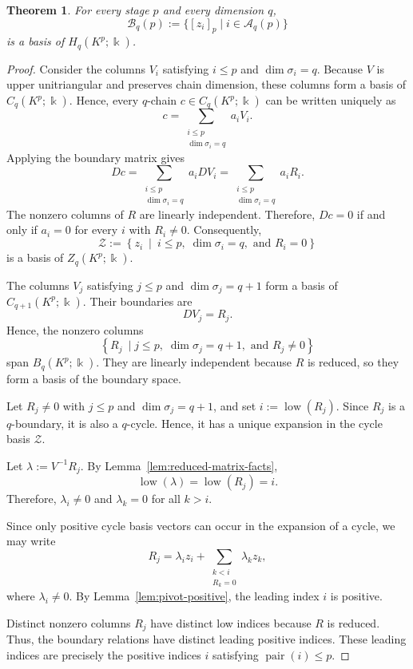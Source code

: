 \documentclass[11pt]{article}
\theoremstyle{paperdefinition}
\theoremstyle{paperplain}
\newtheorem{theorem}[definition]{Theorem}
\theoremstyle{paperremark}
\begin{document}
\begin{theorem}
\label{thm:active-basis}
For every stage $p$ and every dimension $q$,
\[
\mathcal B_q(p) := \{[z_i]_p\mid i\in\mathcal A_q(p)\}
\]
is a basis of $H_q(K^p;\Bbbk)$.
\end{theorem}

\begin{proof}
Consider the columns $V_i$ satisfying $i\leq p$ and $\dim\sigma_i=q$. Because $V$ is upper unitriangular and preserves chain dimension, these columns form a basis of $C_q(K^p;\Bbbk)$. Hence, every $q$-chain $c\in C_q(K^p;\Bbbk)$ can be written uniquely as
\[
c = \sum_{\substack{i\leq p\\ \dim\sigma_i=q}}a_iV_i.
\]
Applying the boundary matrix gives
\[
Dc = \sum_{\substack{i\leq p\\ \dim\sigma_i=q}}a_iDV_i = \sum_{\substack{i\leq p\\ \dim\sigma_i=q}} a_iR_i.
\]
The nonzero columns of $R$ are linearly independent. Therefore, $Dc=0$ if and only if $a_i=0$ for every $i$ with $R_i\neq 0$. Consequently,
\[
\mathcal{Z} := \left\{z_i\ \mid \ i \leq p,\;\dim\sigma_i=q, \text{ and }R_i=0\right\}
\]
is a basis of $Z_q(K^p;\Bbbk)$.

The columns $V_j$ satisfying $j\leq p$ and $\dim\sigma_j=q+1$ form a basis of $C_{q+1}(K^p;\Bbbk)$. Their boundaries are
\[
DV_j=R_j.
\]
Hence, the nonzero columns
\[
\left\{R_j\ \mid j\leq p,\;\dim\sigma_j=q+1,\text{ and } R_j\neq 0\right\}
\]
span $B_q(K^p;\Bbbk)$. They are linearly independent because $R$ is reduced, so they form a basis of the boundary space.

Let $R_j\neq 0$ with $j\leq p$ and $\dim\sigma_j=q+1$, and set $i:=\operatorname{low}(R_j)$. Since $R_j$ is a $q$-boundary, it is also a $q$-cycle. Hence, it has a unique expansion in the cycle basis $\mathcal{Z}$.

Let $\lambda:=V^{-1}R_j$. By Lemma~\ref{lem:reduced-matrix-facts},
\[
\operatorname{low}(\lambda) = \operatorname{low}(R_j) = i.
\]
Therefore, $\lambda_i\neq 0$ and $\lambda_k=0$ for all $k>i$.

Since only positive cycle basis vectors can occur in the expansion of a cycle, we may write
\[
R_j = \lambda_i z_i + \sum_{\substack{k<i\\ R_k=0}}\lambda_k z_k,
\]
where $\lambda_i\neq 0$. By Lemma~\ref{lem:pivot-positive}, the leading index $i$ is positive.

Distinct nonzero columns $R_j$ have distinct low indices because $R$ is reduced. Thus, the boundary relations have distinct leading positive indices. These leading indices are precisely the positive indices $i$ satisfying $\operatorname{pair}(i)\leq p$.


\end{proof}
\end{document}
